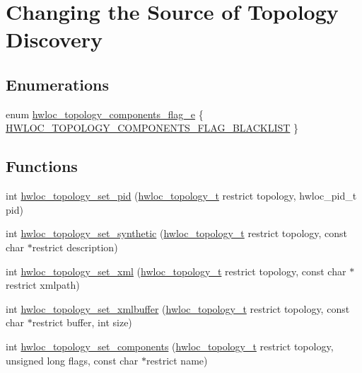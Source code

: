 \hypertarget{a00192}{}\section{Changing the Source of Topology Discovery}
\label{a00192}
\subsection*{Enumerations}
\begin{DoxyCompactItemize}
\item 
enum \hyperlink{a00192_ga949f656c779208a36790feba24048b7e}{hwloc\+\_\+topology\+\_\+components\+\_\+flag\+\_\+e} \{ \hyperlink{a00192_gga949f656c779208a36790feba24048b7ea33eec25d29253a2aba21dd3c731b416e}{H\+W\+L\+O\+C\+\_\+\+T\+O\+P\+O\+L\+O\+G\+Y\+\_\+\+C\+O\+M\+P\+O\+N\+E\+N\+T\+S\+\_\+\+F\+L\+A\+G\+\_\+\+B\+L\+A\+C\+K\+L\+I\+ST}
 \}
\end{DoxyCompactItemize}
\subsection*{Functions}
\begin{DoxyCompactItemize}
\item 
int \hyperlink{a00192_ga341fc17b5867a4715570baab131f68cd}{hwloc\+\_\+topology\+\_\+set\+\_\+pid} (\hyperlink{a00186_ga9d1e76ee15a7dee158b786c30b6a6e38}{hwloc\+\_\+topology\+\_\+t} restrict topology, hwloc\+\_\+pid\+\_\+t pid)
\item 
int \hyperlink{a00192_ga4fab186bb6181a00bcf585825fddd38d}{hwloc\+\_\+topology\+\_\+set\+\_\+synthetic} (\hyperlink{a00186_ga9d1e76ee15a7dee158b786c30b6a6e38}{hwloc\+\_\+topology\+\_\+t} restrict topology, const char $\ast$restrict description)
\item 
int \hyperlink{a00192_ga879439b7ee99407ee911b3ac64e9a25e}{hwloc\+\_\+topology\+\_\+set\+\_\+xml} (\hyperlink{a00186_ga9d1e76ee15a7dee158b786c30b6a6e38}{hwloc\+\_\+topology\+\_\+t} restrict topology, const char $\ast$restrict xmlpath)
\item 
int \hyperlink{a00192_ga2745616b65595e1c1e579ecc7e461fa8}{hwloc\+\_\+topology\+\_\+set\+\_\+xmlbuffer} (\hyperlink{a00186_ga9d1e76ee15a7dee158b786c30b6a6e38}{hwloc\+\_\+topology\+\_\+t} restrict topology, const char $\ast$restrict buffer, int size)
\item 
int \hyperlink{a00192_ga9ad41adf418cee1c0ee32ba9bd4a3d36}{hwloc\+\_\+topology\+\_\+set\+\_\+components} (\hyperlink{a00186_ga9d1e76ee15a7dee158b786c30b6a6e38}{hwloc\+\_\+topology\+\_\+t} restrict topology, unsigned long flags, const char $\ast$restrict name)
\end{DoxyCompactItemize}


